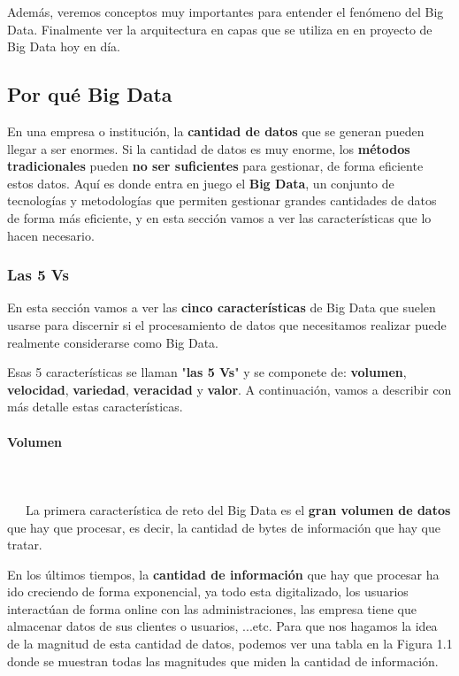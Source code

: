 Además, veremos conceptos muy importantes para entender el fenómeno del Big Data. Finalmente ver la arquitectura en capas que se utiliza en en proyecto de Big Data hoy en día.

\subsection{Por qué Big Data}
En una empresa o institución, la \textbf{cantidad de datos} que se generan pueden llegar a ser enormes. Si la cantidad de datos es muy enorme, los \textbf{métodos tradicionales} pueden \textbf{no ser suficientes} para gestionar, de forma eficiente estos datos. Aquí es donde entra en juego el \textbf{Big Data}, un conjunto de tecnologías y metodologías que permiten gestionar grandes cantidades de datos de forma más eficiente, y en esta sección vamos a ver las características que lo hacen necesario.

\subsubsection{Las 5 Vs}
En esta sección vamos a ver las \textbf{cinco características} de Big Data que suelen usarse para discernir si el procesamiento de datos que necesitamos realizar puede realmente considerarse como Big Data.

Esas 5 características se llaman "\textbf{las 5 Vs}" y se componete de: \textbf{volumen}, \textbf{velocidad}, \textbf{variedad}, \textbf{veracidad} y \textbf{valor}. A continuación, vamos a describir con más detalle estas características.

\paragraph{Volumen}
~\\\\
\-\ \-\ \-\ La primera característica de reto del Big Data es el \textbf{gran volumen de datos} que hay que procesar, es decir, la cantidad de bytes de información que hay que tratar.

En los últimos tiempos, la \textbf{cantidad de información} que hay que procesar ha ido creciendo de forma exponencial, ya todo esta digitalizado, los usuarios interactúan de forma online con las administraciones, las empresa tiene que almacenar datos de sus clientes o usuarios, ...etc. Para que nos hagamos la idea de la magnitud de esta cantidad de datos, podemos ver una tabla en la Figura 1.1 donde se muestran todas las magnitudes que miden la cantidad de información.


